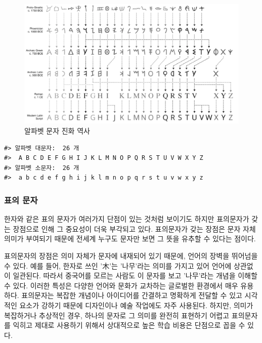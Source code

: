 \documentclass[
  letterpaper,
]{book}
\begin{document}
\begin{figure}

{\centering \includegraphics{images/writing-alphabet.png}

}

\caption{알파벳 문자 진화 역사}

\end{figure}

\begin{verbatim}
#> 알파벳 대문자:  26 개
#>  A B C D E F G H I J K L M N O P Q R S T U V W X Y Z
#> 알파벳 소문자:  26 개
#>  a b c d e f g h i j k l m n o p q r s t u v w x y z
\end{verbatim}

\hypertarget{uxd45cuxc758-uxbb38uxc790}{%
\subsubsection{표의 문자}\label{uxd45cuxc758-uxbb38uxc790}}

한자와 같은 표의 문자가 여러가지 단점이 있는 것처럼 보이기도 하지만
표의문자가 갖는 장점으로 인해 그 중요성이 더욱 부각되고 있다. 표의문자가
갖는 장점은 문자 자체 의미가 부여되기 때문에 전세계 누구도 문자만 보면
그 뜻을 유추할 수 있다는 점이다.

표의문자의 장점은 의미 자체가 문자에 내재되어 있기 때문에, 언어의 장벽을
뛰어넘을 수 있다. 예를 들어, 한자로 쓰인 '木'는 '나무'라는 의미를 가지고
있어 언어에 상관없이 일관된다. 따라서 중국어를 모르는 사람도 이 문자를
보고 '나무'라는 개념을 이해할 수 있다. 이러한 특성은 다양한 언어와
문화가 교차하는 글로벌한 환경에서 매우 유용하다. 표의문자는 복잡한
개념이나 아이디어를 간결하고 명확하게 전달할 수 있고 시각적인 요소가
강하기 때문에 디자인이나 예술 작업에도 자주 사용된다. 하지만, 의미가
복잡하거나 추상적인 경우, 하나의 문자로 그 의미를 완전히 표현하기 어렵고
표의문자를 익히고 제대로 사용하기 위해서 상대적으로 높은 학습 비용은
단점으로 꼽을 수 있다.
\end{document}
